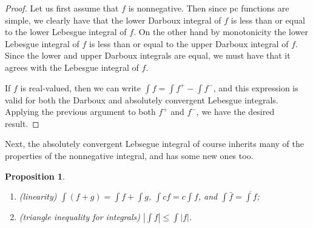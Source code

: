 \documentclass[11pt,oneside]{amsbook}
\theoremstyle{definition}
\theoremstyle{plain}
\newtheorem{prop}[thm]{Proposition}
\theoremstyle{definition}
\theoremstyle{remark}
\numberwithin{equation}{section}
\numberwithin{figure}{section}
\begin{document}
\begin{proof}
  Let us first assume that $f$ is nonnegative. Then since pc functions are simple, we clearly have that the lower Darboux integral of $f$ is less than or equal to the lower Lebesgue integral of $f$. On the other hand by monotonicity the lower Lebesgue integral of $f$ is less than or equal to the upper Darboux integral of $f$. Since the lower and upper Darboux integrals are equal, we must have that it agrees with the Lebesgue integral of $f$.

  If $f$ is real-valued, then we can write $\int f=\int f^+-\int f^-$, and this expression is valid for both the Darboux and absolutely convergent Lebesgue integrals. Applying the previous argument to both $f^+$ and $f^-$, we have the desired result.
\end{proof}

Next, the absolutely convergent Lebsegue integral of course inherits many of the properties of the nonnegative integral, and has some new ones too.

\begin{prop}
  \begin{enumerate}
  \item (linearity) $\int(f+g)=\int f+\int g$, $\int cf=c\int f$, and $\int\bar f=\overline{\int f}$;
  \item (triangle inequality for integrals) $\left|\int f\right|\leq\int|f|$.
  \end{enumerate}
\end{prop}
\end{document}
